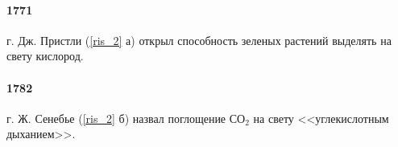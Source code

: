 \begin{figure}[h]
\begin{minipage}[h]{0.49\linewidth}
\end{minipage}
\label{ris_1}
\end{figure}


\paragraph*{1771} г. Дж. Пристли (\ris \ref{ris_2} а) открыл способность зеленых растений выделять на свету кислород.


\paragraph*{1782} г. Ж. Сенебье (\ris \ref{ris_2} б) назвал поглощение $СО_{2}$ на свету <<углекислотным дыханием>>.  

